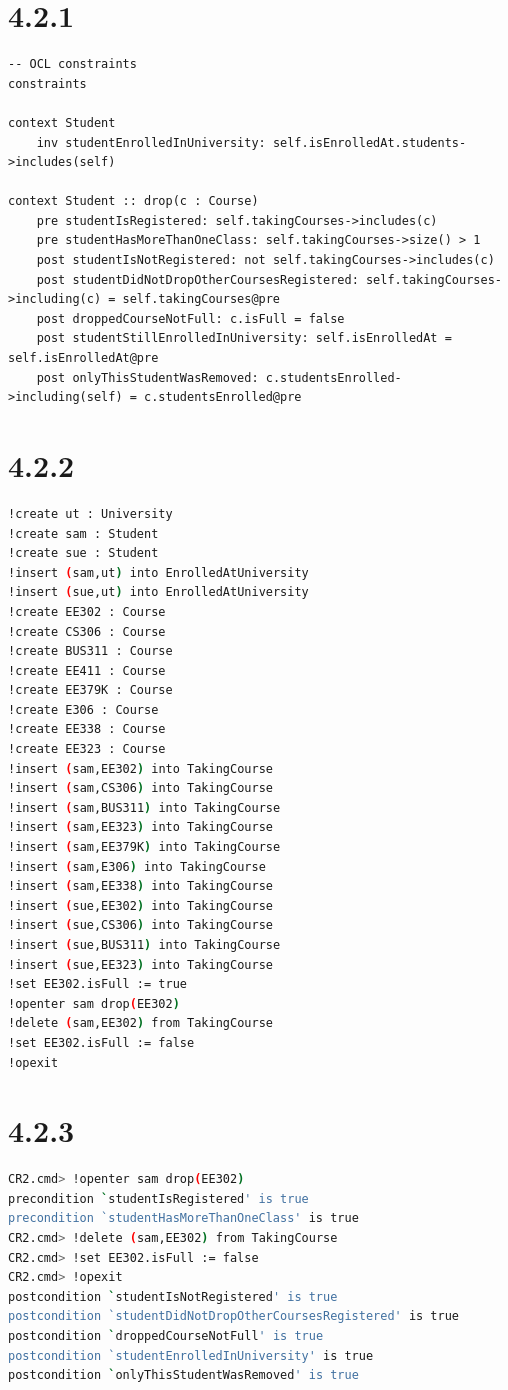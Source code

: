 \documentclass{article}
\begin{document}
\section*{4.2.1}
\begin{lstlisting}
-- OCL constraints
constraints

context Student
	inv studentEnrolledInUniversity: self.isEnrolledAt.students->includes(self)

context Student :: drop(c : Course)
	pre studentIsRegistered: self.takingCourses->includes(c)
	pre studentHasMoreThanOneClass: self.takingCourses->size() > 1
	post studentIsNotRegistered: not self.takingCourses->includes(c)
	post studentDidNotDropOtherCoursesRegistered: self.takingCourses->including(c) = self.takingCourses@pre
	post droppedCourseNotFull: c.isFull = false
	post studentStillEnrolledInUniversity: self.isEnrolledAt = self.isEnrolledAt@pre
	post onlyThisStudentWasRemoved: c.studentsEnrolled->including(self) = c.studentsEnrolled@pre
\end{lstlisting}	
\section*{4.2.2}
\begin{lstlisting}[language=bash,otherkeywords={*,create,insert,delete,openter,opexit}]
!create ut : University
!create sam : Student
!create sue : Student
!insert (sam,ut) into EnrolledAtUniversity
!insert (sue,ut) into EnrolledAtUniversity
!create EE302 : Course
!create CS306 : Course
!create BUS311 : Course
!create EE411 : Course
!create EE379K : Course
!create E306 : Course
!create EE338 : Course
!create EE323 : Course
!insert (sam,EE302) into TakingCourse
!insert (sam,CS306) into TakingCourse
!insert (sam,BUS311) into TakingCourse
!insert (sam,EE323) into TakingCourse
!insert (sam,EE379K) into TakingCourse
!insert (sam,E306) into TakingCourse
!insert (sam,EE338) into TakingCourse
!insert (sue,EE302) into TakingCourse
!insert (sue,CS306) into TakingCourse
!insert (sue,BUS311) into TakingCourse
!insert (sue,EE323) into TakingCourse
!set EE302.isFull := true
!openter sam drop(EE302)
!delete (sam,EE302) from TakingCourse
!set EE302.isFull := false
!opexit
\end{lstlisting}
\section*{4.2.3}
\begin{lstlisting}[language=bash]
CR2.cmd> !openter sam drop(EE302)
precondition `studentIsRegistered' is true
precondition `studentHasMoreThanOneClass' is true
CR2.cmd> !delete (sam,EE302) from TakingCourse
CR2.cmd> !set EE302.isFull := false
CR2.cmd> !opexit
postcondition `studentIsNotRegistered' is true
postcondition `studentDidNotDropOtherCoursesRegistered' is true
postcondition `droppedCourseNotFull' is true
postcondition `studentEnrolledInUniversity' is true
postcondition `onlyThisStudentWasRemoved' is true
\end{lstlisting}
 
\end{document}
